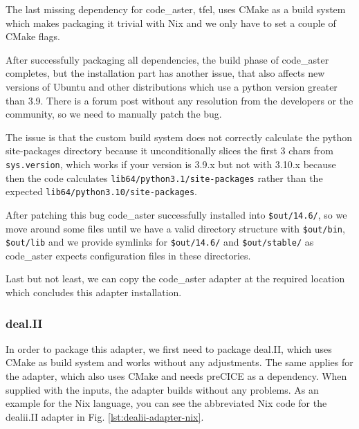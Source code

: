 \documentclass[conference,final,a4paper]{IEEEtran}
\begin{document}
The last missing dependency for code\_aster, tfel, uses CMake as a build system which makes packaging it trivial with Nix and we only have to set a couple of CMake flags.

After successfully packaging all dependencies, the build phase of code\_aster completes, but the installation part has another issue, that also affects new versions of Ubuntu and other distributions which use a python version greater than 3.9.
There is a forum post without any resolution from the developers or the community, so we need to manually patch the bug.

The issue is that the custom build system does not correctly calculate the python site-packages directory because it unconditionally slices the first 3 chars from \texttt{sys.version}, which works if your version is 3.9.x but not with 3.10.x because then the code calculates \texttt{lib64/python3.1/site-packages} rather than the expected \texttt{lib64/python3.10/site-packages}.

After patching this bug code\_aster successfully installed into \texttt{\$out/14.6/}, so we move around some files until we have a valid directory structure with \texttt{\$out/bin}, \texttt{\$out/lib} and we provide symlinks for \texttt{\$out/14.6/} and \texttt{\$out/stable/} as code\_aster expects configuration files in these directories.

Last but not least, we can copy the code\_aster adapter at the required location which concludes this adapter installation.\\

\subsubsection{deal.II}

In order to package this adapter, we first need to package deal.II, which uses CMake as build system and works without any adjustments.
The same applies for the adapter, which also uses CMake and needs preCICE as a dependency.
When supplied with the inputs, the adapter builds without any problems.
As an example for the Nix language, you can see the abbreviated Nix code for the dealii.II adapter in Fig. \ref{lst:dealii-adapter-nix}.\\
\end{document}
